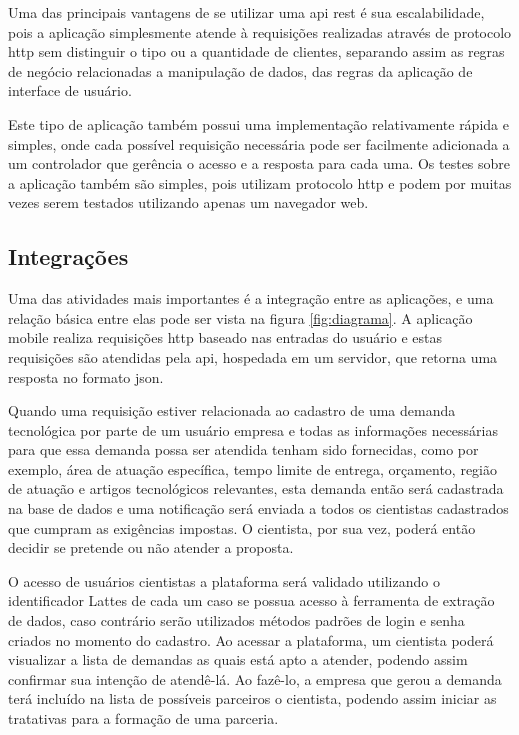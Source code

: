Uma das principais vantagens de se utilizar uma \gls{api} \gls{rest} é sua escalabilidade, pois a aplicação simplesmente atende à requisições realizadas através de protocolo \gls{http} sem distinguir o tipo ou a quantidade de clientes, separando assim as regras de negócio relacionadas a manipulação de dados, das regras da aplicação de interface de usuário.

Este tipo de aplicação também possui uma implementação relativamente rápida e simples, onde cada possível requisição necessária pode ser facilmente adicionada a um controlador que gerência o acesso e a resposta para cada uma. Os testes sobre a aplicação também são simples, pois utilizam protocolo \gls{http} e podem por muitas vezes serem testados utilizando apenas um navegador web.

\subsection{Integrações}\label{subsec:integrar}

Uma das atividades mais importantes é a integração entre as aplicações, e uma relação básica entre elas pode ser vista na figura \ref{fig:diagrama}. A aplicação mobile realiza requisições \gls{http} baseado nas entradas do usuário e estas requisições são atendidas pela \gls{api}, hospedada em um servidor, que retorna uma resposta no formato \gls{json}.

Quando uma requisição estiver relacionada ao cadastro de uma demanda tecnológica por parte de um usuário empresa e todas as informações necessárias para que essa demanda possa ser atendida tenham sido fornecidas, como por exemplo, área de atuação específica, tempo limite de entrega, orçamento, região de atuação e artigos tecnológicos relevantes, esta demanda então será cadastrada na base de dados e uma notificação será enviada a todos os cientistas cadastrados que cumpram as exigências impostas. O cientista, por sua vez, poderá então decidir se pretende ou não atender a proposta.

O acesso de usuários cientistas a plataforma será validado utilizando o identificador Lattes de cada um caso se possua acesso à ferramenta de extração de dados, caso contrário serão utilizados métodos padrões de login e senha criados no momento do cadastro. Ao acessar a plataforma, um cientista poderá visualizar a lista de demandas as quais está apto a atender, podendo assim confirmar sua intenção de atendê-lá. Ao fazê-lo, a empresa que gerou a demanda terá incluído na lista de possíveis parceiros o cientista, podendo assim iniciar as tratativas para a formação de uma parceria.

